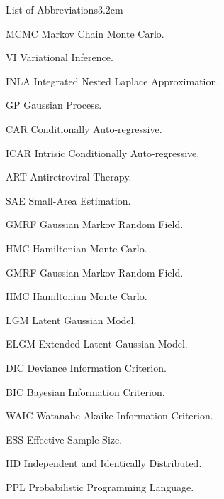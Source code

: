 \begin{mclistof}{List of Abbreviations}{3.2cm}
\item[MCMC] Markov Chain Monte Carlo.
\item[VI] Variational Inference.
\item[INLA] Integrated Nested Laplace Approximation.
\item[GP] Gaussian Process.
\item[CAR] Conditionally Auto-regressive.
\item[ICAR] Intrisic Conditionally Auto-regressive.
\item[ART] Antiretroviral Therapy.
\item[SAE] Small-Area Estimation.
\item[GMRF] Gaussian Markov Random Field.
\item[HMC] Hamiltonian Monte Carlo.
\item[GMRF] Gaussian Markov Random Field.
\item[HMC] Hamiltonian Monte Carlo.
\item[LGM] Latent Gaussian Model.
\item[ELGM] Extended Latent Gaussian Model.
\item[DIC] Deviance Information Criterion.
\item[BIC] Bayesian Information Criterion.
\item[WAIC] Watanabe-Akaike Information Criterion.
\item[ESS] Effective Sample Size.
\item[IID] Independent and Identically Distributed.
\item[PPL] Probabilistic Programming Language.

\end{mclistof} 

